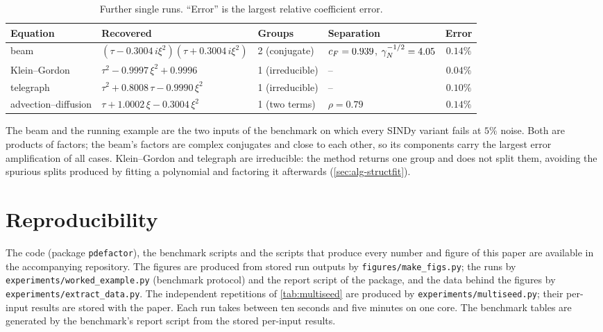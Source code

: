 \begin{table}[htbp]
\centering\small
\caption{Further single runs. ``Error'' is the largest relative coefficient error.}\label{tab:cases}
\footnotesize
\begin{tabular}{@{}llllc@{}}
\toprule
Equation & Recovered & Groups & Separation & Error\\
\midrule
beam & $(\tau-0.3004\,i\xi^2)(\tau+0.3004\,i\xi^2)$ & 2 (conjugate) & $c_{F}=0.939$, $\gamma_{N}^{-1/2}=4.05$ & $0.14\%$\\
Klein--Gordon & $\tau^2-0.9997\,\xi^2+0.9996$ & 1 (irreducible) & -- & $0.04\%$\\
telegraph & $\tau^2+0.8008\,\tau-0.9990\,\xi^2$ & 1 (irreducible) & -- & $0.10\%$\\
advection--diffusion & $\tau+1.0002\,\xi-0.3004\,\xi^2$ & 1 (two terms) & $\rho=0.79$ & $0.14\%$\\
\bottomrule
\end{tabular}
\end{table}

The beam and the running example are the two inputs of the benchmark on which every SINDy variant fails at
$5\%$ noise. Both are products of factors; the beam's factors are complex conjugates and close to each other,
so its components carry the largest error amplification of all cases. Klein--Gordon and telegraph are irreducible:
the method returns one group and does not split them, avoiding the spurious splits produced by fitting a polynomial and
factoring it afterwards (\cref{sec:alg-structfit}).

\section{Reproducibility}\label{app:repro}
The code (package \texttt{pdefactor}), the benchmark scripts and the scripts that produce every number and figure of
this paper are available in the accompanying repository. The figures are produced from stored run outputs by
\nolinkurl{figures/make_figs.py}; the runs by \nolinkurl{experiments/worked_example.py} (benchmark protocol) and the
report script of the package, and the data behind the figures by \nolinkurl{experiments/extract_data.py}. The independent repetitions of \cref{tab:multiseed} are produced by
\nolinkurl{experiments/multiseed.py}; their per-input results are stored with the paper. Each run
takes between ten seconds and five minutes on one core. The benchmark tables are generated by the benchmark's
report script from the stored per-input results.
